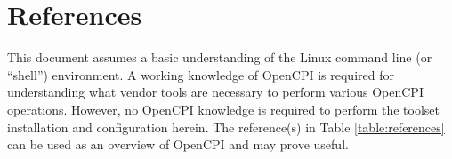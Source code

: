 \tableofcontents

\newpage

\section{References}

	This document assumes a basic understanding of the Linux command line (or ``shell'') environment. A working knowledge of OpenCPI is required for understanding what vendor tools are necessary to perform various OpenCPI operations. However, no OpenCPI knowledge is required to perform the toolset installation and configuration herein. The reference(s) in Table \ref{table:references} can be used as an overview of OpenCPI and may prove useful.
\def\refcapbottom{}


